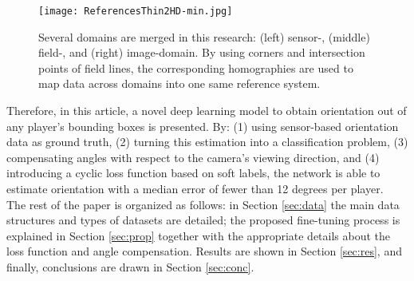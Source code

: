 \documentclass{article}
\newcommand{\cb}[2]{{\sout{#1}}{\color{cyan}#2}}
\begin{document}
\begin{figure*}
\begin{center}
  \texttt{[image: ReferencesThin2HD-min.jpg]}
  \caption{Several domains are merged in this research: (left) sensor-, (middle) field-, and (right) image-domain. By using corners and intersection points of field lines, the corresponding homographies are used to map data across domains into one same reference system.}
  \label{fig:ref1}
 \end{center}
\end{figure*}
Therefore, in this article, a novel deep learning %
model to obtain orientation out of any player's bounding boxes is presented. By: (1) using sensor-based orientation data as ground truth, (2) turning this estimation into a classification problem, (3) compensating angles with respect to the camera's viewing direction, and (4) introducing a cyclic loss function based on soft labels, the network is able to estimate orientation with a median error of fewer than 12 degrees per player. \\ %
The rest of the paper is organized as follows: in Section \ref{sec:data} the main data structures and types of datasets are detailed; the proposed fine-tuning process is explained in Section \ref{sec:prop} together with the appropriate details about the loss function and angle compensation. Results are shown in Section \ref{sec:res}, and finally, conclusions are drawn in Section \ref{sec:conc}. 

\end{document}
